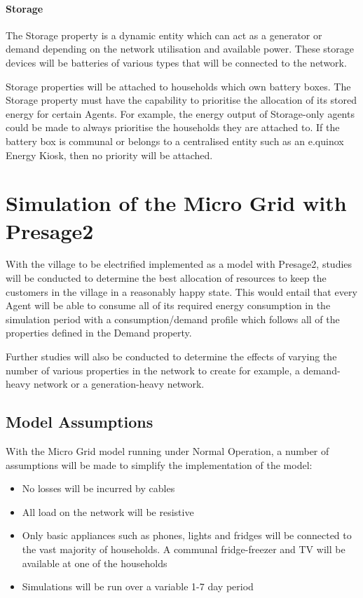 \documentclass{article}
\begin{document}
\paragraph{Storage}
The Storage property is a dynamic entity which can act as a generator or demand depending on the network utilisation and available power. These storage devices will be batteries of various types that will be connected to the network.

Storage properties will be attached to households which own battery boxes. The Storage property must have the capability to prioritise the allocation of its stored energy for certain Agents. For example, the energy output of Storage-only agents could be made to always prioritise the households they are attached to. If the battery box is communal or belongs to a centralised entity such as an e.quinox Energy Kiosk, then no priority will be attached.

\section{Simulation of the Micro Grid with Presage2}
With the village to be electrified implemented as a model with Presage2, studies will be conducted to determine the best allocation of resources to keep the customers in the village in a reasonably happy state. This would entail that every Agent will be able to consume all of its required energy consumption in the simulation period with a consumption/demand profile which follows all of the properties defined in the Demand property.

Further studies will also be conducted to determine the effects of varying the number of various properties in the network to create for example, a demand-heavy network or a generation-heavy network.  

\subsection{Model Assumptions}
With the Micro Grid model running under Normal Operation, a number of assumptions will be made to simplify the implementation of the model:
\begin{itemize}
\item No losses will be incurred by cables
\item All load on the network will be resistive
\item Only basic appliances such as phones, lights and fridges will be connected to the vast majority of households. A communal fridge-freezer and TV will be available at one of the households
\item Simulations will be run over a variable 1-7 day period
\end{itemize}
\end{document}
